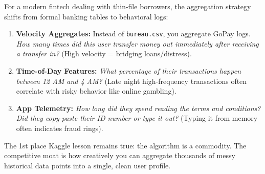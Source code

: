 \documentclass[11pt,a4paper]{article}
\begin{document}
For a modern fintech dealing with thin-file borrowers, the aggregation strategy shifts from formal banking tables to behavioral logs:

\begin{enumerate}
    \item \textbf{Velocity Aggregates:} Instead of \texttt{bureau.csv}, you aggregate GoPay logs. \textit{How many times did this user transfer money out immediately after receiving a transfer in?} (High velocity = bridging loans/distress).
    \item \textbf{Time-of-Day Features:} \textit{What percentage of their transactions happen between 12 AM and 4 AM?} (Late night high-frequency transactions often correlate with risky behavior like online gambling).
    \item \textbf{App Telemetry:} \textit{How long did they spend reading the terms and conditions? Did they copy-paste their ID number or type it out?} (Typing it from memory often indicates fraud rings).
\end{enumerate}

The 1st place Kaggle lesson remains true: the algorithm is a commodity. The competitive moat is how creatively you can aggregate thousands of messy historical data points into a single, clean user profile.
\end{document}
